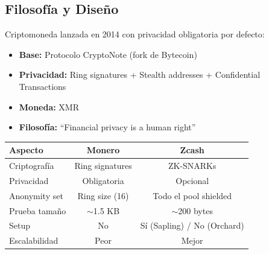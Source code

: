 \documentclass[11pt,a4paper,twoside]{book}
\begin{document}
\subsection{Filosof\'ia y Dise\~no}

\begin{definition}[Monero]
Criptomoneda lanzada en 2014 con privacidad obligatoria por defecto:
\begin{itemize}
    \item \textbf{Base:} Protocolo CryptoNote (fork de Bytecoin)
    \item \textbf{Privacidad:} Ring signatures + Stealth addresses + Confidential Transactions
    \item \textbf{Moneda:} XMR
    \item \textbf{Filosof\'ia:} ``Financial privacy is a human right''
\end{itemize}
\end{definition}

\begin{center}
\begin{tabular}{lcc}
\toprule
\textbf{Aspecto} & \textbf{Monero} & \textbf{Zcash} \\
\midrule
Criptograf\'ia & Ring signatures & ZK-SNARKs \\
Privacidad & Obligatoria & Opcional \\
Anonymity set & Ring size (16) & Todo el pool shielded \\
Prueba tama\~no & $\sim$1.5 KB & $\sim$200 bytes \\
Setup & No & S\'i (Sapling) / No (Orchard) \\
Escalabilidad & Peor & Mejor \\
\bottomrule
\end{tabular}
\end{center}
\end{document}
